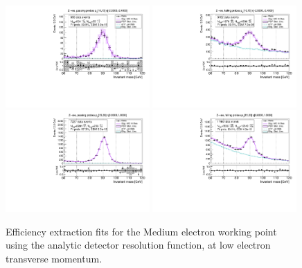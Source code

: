 {\begin{figure}
\centering
\includegraphics[width=0.49\textwidth]{figures/Zee_ResFunc_BkgLPiEMu_pass_ptBin0_etaBin0.pdf}
\includegraphics[width=0.49\textwidth]{figures/Zee_ResFunc_BkgLPiEMu_fail_ptBin0_etaBin0.pdf}
\includegraphics[width=0.49\textwidth]{figures/Zee_ResFunc_BkgLPiEMu_pass_ptBin1_etaBin19.pdf}
\includegraphics[width=0.49\textwidth]{figures/Zee_ResFunc_BkgLPiEMu_fail_ptBin1_etaBin19.pdf}
\caption{Efficiency extraction fits for the Medium electron working point using the analytic detector resolution function, at low electron transverse momentum.}
\label{fig:ZeeAltSigResFits1}
\end{figure}

}
